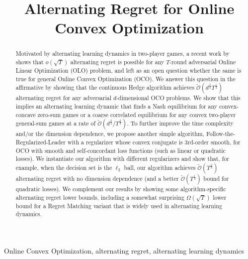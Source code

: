 \documentclass[preprint,12pt]{colt2025}
\title[Alternating Regret for Online Convex Optimization]{Alternating Regret for Online Convex Optimization}
\begin{document}
\maketitle

\begin{abstract}%
Motivated by alternating learning dynamics in two-player games, a recent work by \citet{cevher2024alternation} shows that $o(\sqrt{T})$ alternating regret is possible for any $T$-round adversarial Online Linear Optimization (OLO) problem, and left as an open question whether the same is true for general Online Convex Optimization (OCO).
We answer this question in the affirmative by showing that 
the continuous Hedge algorithm achieves $\tilde{\mathcal{O}}(d^{\frac{2}{3}}T^{\frac{1}{3}})$ alternating regret for any adversarial $d$-dimensional OCO problems.
We show that this implies an alternating learning dynamic that finds a Nash equilibrium for any convex-concave zero-sum games or a coarse correlated equilibrium for any convex two-player general-sum games at a rate of $\tilde{\mathcal{O}}(d^{\frac{2}{3}}/T^{\frac{2}{3}})$.
To further improve the time complexity and/or the dimension dependence, we propose another simple algorithm, Follow-the-Regularized-Leader with a regularizer whose convex conjugate is 3rd-order smooth, for OCO with smooth and self-concordant loss functions (such as linear or quadratic losses).
We instantiate our algorithm with different regularizers and show that, for example, when the decision set is the $\ell_2$ ball, our algorithm achieves $\tilde{\mathcal{O}}(T^{\frac{2}{5}})$ alternating regret with no dimension dependence (and a better $\tilde{\mathcal{O}}(T^{\frac{1}{3}})$ bound for quadratic losses).
We complement our results by showing some algorithm-specific alternating regret lower bounds, including a somewhat surprising $\Omega(\sqrt{T})$ lower bound for a Regret Matching variant that is widely used in alternating learning dynamics.
\end{abstract}

\begin{keywords}%
Online Convex Optimization, alternating regret, alternating learning dynamics
\end{keywords}









\newpage
\appendix






\end{document}
